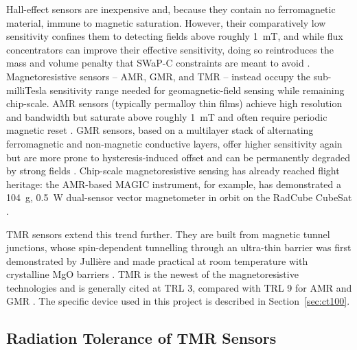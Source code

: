 \documentclass[12pt,a4paper]{article}
\begin{document}
Hall-effect sensors are inexpensive and, because they contain no ferromagnetic material, immune to magnetic saturation. However, their comparatively low sensitivity confines them to detecting fields above roughly \SI{1}{\milli\tesla}, and while flux concentrators can improve their effective sensitivity, doing so reintroduces the mass and volume penalty that SWaP-C constraints are meant to avoid \cite{amr-gmr-hall-bridging}. Magnetoresistive sensors -- AMR, GMR, and TMR -- instead occupy the sub-milliTesla sensitivity range needed for geomagnetic-field sensing while remaining chip-scale. AMR sensors (typically permalloy thin films) achieve high resolution and bandwidth but saturate above roughly \SI{1}{\milli\tesla} and often require periodic magnetic reset \cite{amr-gmr-hall-bridging}. GMR sensors, based on a multilayer stack of alternating ferromagnetic and non-magnetic conductive layers, offer higher sensitivity again but are more prone to hysteresis-induced offset and can be permanently degraded by strong fields \cite{amr-gmr-hall-bridging}. Chip-scale magnetoresistive sensing has already reached flight heritage: the AMR-based MAGIC instrument, for example, has demonstrated a \SI{104}{\gram}, \SI{0.5}{\watt} dual-sensor vector magnetometer in orbit on the RadCube CubeSat \cite{magic-radcube}.

TMR sensors extend this trend further. They are built from magnetic tunnel junctions, whose spin-dependent tunnelling through an ultra-thin barrier was first demonstrated by Julli\`ere \cite{julliere1975} and made practical at room temperature with crystalline MgO barriers \cite{parkin2004,yuasa2004}. TMR is the newest of the magnetoresistive technologies and is generally cited at TRL 3, compared with TRL 9 for AMR and GMR \cite{alves-thesis}. The specific device used in this project is described in Section~\ref{sec:ct100}.

\subsection{Radiation Tolerance of TMR Sensors}
\label{sec:rad-tolerance-lit}
\end{document}
